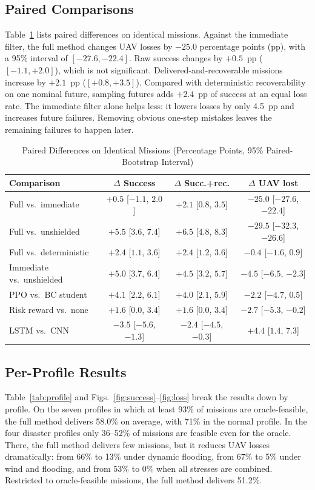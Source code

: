 \documentclass{ieeeaccess}
\begin{document}
\subsection{Paired Comparisons}
Table~\ref{tab:paired} lists paired differences on identical missions. Against the immediate filter, the full method changes UAV losses by $-25.0$ percentage points (pp), with a 95\% interval of $[-27.6,-22.4]$. Raw success changes by $+0.5$~pp ($[-1.1,+2.0]$), which is not significant. Delivered-and-recoverable missions increase by $+2.1$~pp ($[+0.8,+3.5]$). Compared with deterministic recoverability on one nominal future, sampling futures adds $+2.4$~pp of success at an equal loss rate. The immediate filter alone helps less: it lowers losses by only 4.5~pp and increases future failures. Removing obvious one-step mistakes leaves the remaining failures to happen later.

\begin{table}[t]
\caption{Paired Differences on Identical Missions (Percentage Points, 95\% Paired-Bootstrap Interval)}
\label{tab:paired}
\centering
\setlength{\tabcolsep}{10pt}
\begin{tabular}{@{}lccc@{}}
\toprule
Comparison & $\Delta$ Success & $\Delta$ Succ.+rec. & $\Delta$ UAV lost \\
\midrule
Full vs.\ immediate & $+0.5$ [$-1.1$, $2.0$] & $+2.1$ [$0.8$, $3.5$] & $-25.0$ [$-27.6$, $-22.4$] \\
Full vs.\ unshielded & $+5.5$ [$3.6$, $7.4$] & $+6.5$ [$4.8$, $8.3$] & $-29.5$ [$-32.3$, $-26.6$] \\
Full vs.\ deterministic & $+2.4$ [$1.1$, $3.6$] & $+2.4$ [$1.2$, $3.6$] & $-0.4$ [$-1.6$, $0.9$] \\
Immediate vs.\ unshielded & $+5.0$ [$3.7$, $6.4$] & $+4.5$ [$3.2$, $5.7$] & $-4.5$ [$-6.5$, $-2.3$] \\
PPO vs.\ BC student & $+4.1$ [$2.2$, $6.1$] & $+4.0$ [$2.1$, $5.9$] & $-2.2$ [$-4.7$, $0.5$] \\
Risk reward vs.\ none & $+1.6$ [$0.0$, $3.4$] & $+1.6$ [$0.0$, $3.4$] & $-2.7$ [$-5.3$, $-0.2$] \\
LSTM vs.\ CNN & $-3.5$ [$-5.6$, $-1.3$] & $-2.4$ [$-4.5$, $-0.3$] & $+4.4$ [$1.4$, $7.3$] \\
\bottomrule
\end{tabular}
\end{table}

\subsection{Per-Profile Results}
Table~\ref{tab:profile} and Figs.~\ref{fig:success}--\ref{fig:loss} break the results down by profile. On the seven profiles in which at least 93\% of missions are oracle-feasible, the full method delivers 58.0\% on average, with 71\% in the normal profile. In the four disaster profiles only 36--52\% of missions are feasible even for the oracle. There, the full method delivers few missions, but it reduces UAV losses dramatically: from 66\% to 13\% under dynamic flooding, from 67\% to 5\% under wind and flooding, and from 53\% to 0\% when all stresses are combined. Restricted to oracle-feasible missions, the full method delivers 51.2\%.
\end{document}
